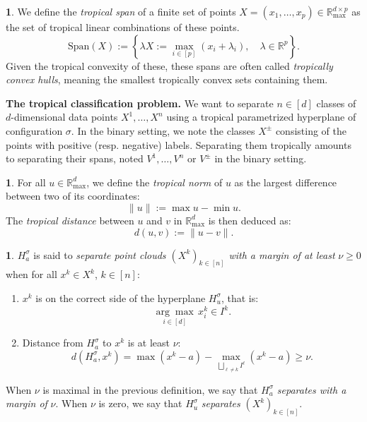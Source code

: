 \documentclass[oneside,english]{amsart}
\numberwithin{equation}{section}
\numberwithin{figure}{section}
\theoremstyle{plain}
\theoremstyle{definition}
\newtheorem{defn}[thm]{\protect\definitionname}
\theoremstyle{plain}
\theoremstyle{remark}
\theoremstyle{plain}
\theoremstyle{definition}
\theoremstyle{definition}
\providecommand{\definitionname}{Definition}
\begin{document}
\begin{defn}
We define the \emph{tropical span} of a finite set of points $X=(x_{1},\ldots,x_{p})\in\mathbb{R}_{\max}^{d\times p}$
as the set of tropical linear combinations of these points.
\[
\text{Span}(X):=\left\{ \lambda X:=\max_{i\in[p]}\left(x_{i}+\lambda_{i}\right),\quad\lambda\in\mathbb{R}^{p}\right\} .
\]
Given the tropical convexity of these, these spans are often called
\emph{tropically convex hulls}, meaning the smallest tropically convex
sets containing them. 
\end{defn}

\textbf{The tropical classification problem. }We want to separate
$n\in[d]$ classes of $d$-dimensional data points $X^{1},\ldots,X^{n}$
using a tropical parametrized hyperplane of configuration $\sigma$.
In the binary setting, we note the classes $X^{\pm}$ consisting of
the points with positive (resp. negative) labels. Separating them
tropically amounts to separating their spans, noted $V^{1},\ldots,V^{n}$
or $V^{\pm}$ in the binary setting.
\begin{defn}
For all $u\in\mathbb{R}_{\max}^{d}$, we define the \emph{tropical
norm} of $u$ as the largest difference between two of its coordinates:
\[
\lVert u\rVert:=\max u-\min u.
\]
The \emph{tropical distance} between $u$ and $v$ in $\mathbb{R}_{\max}^{d}$
is then deduced as: 
\[
d(u,v):=\lVert u-v\rVert.
\]
\end{defn}

\begin{defn}
$H_{a}^{\sigma}$ is said to \emph{separate point clouds $(X^{k})_{k\in[n]}$
with a margin of at least} $\nu\ge0$ when for all $x^{k}\in X^{k}$,
$k\in[n]$:
\begin{enumerate}
\item $x^{k}$ is on the correct side of the hyperplane $H_{u}^{\sigma}$,
that is:
\[
\underset{i\in[d]}{\arg\max}\, x_{i}^{k}\in I^{k}.
\]
\item Distance from $H_{a}^{\sigma}$ to $x^{k}$ is at least $\nu$:
\[
d(H_{a}^{\sigma},x^{k})=\max(x^{k}-a)-\max_{\bigsqcup_{\ell \ne k} I^\ell}(x^{k}-a)\ge\nu.
\]
\end{enumerate}
When $\nu$ is maximal in the previous definition, we say that $H_{a}^{\sigma}$
\emph{separates with a margin of} $\nu$. When $\nu$ is zero, we
say that $H_{u}^{\sigma}$ \emph{separates} $(X^{k})_{k\in[n]}$. 
\end{defn}
\end{document}
